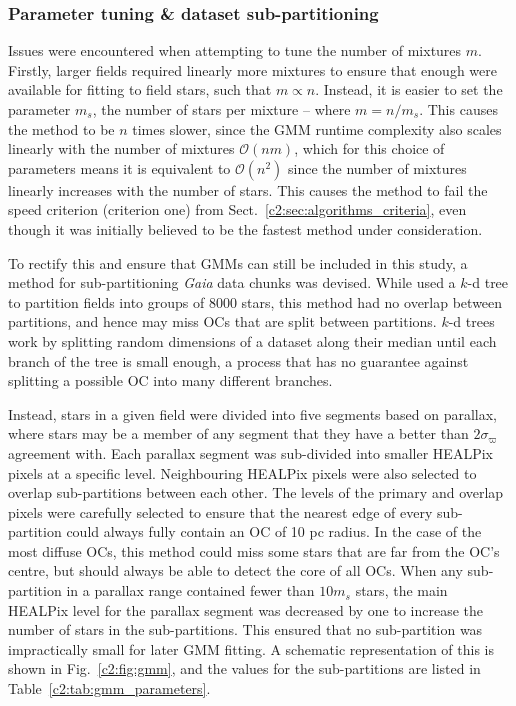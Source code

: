 \subsubsection{Parameter tuning \& dataset sub-partitioning}

Issues were encountered when attempting to tune the number of mixtures $m$. Firstly, larger fields required linearly more mixtures to ensure that enough were available for fitting to field stars, such that $m \propto n$. Instead, it is easier to set the parameter $m_s$, the number of stars per mixture -- where $m = n / m_s$. This causes the method to be $n$ times slower, since the GMM runtime complexity also scales linearly with the number of mixtures $\mathcal{O}(nm)$, which for this choice of parameters means it is equivalent to $\mathcal{O}(n^2)$ since the number of mixtures linearly increases with the number of stars. This causes the method to fail the speed criterion (criterion one) from Sect.~\ref{c2:sec:algorithms_criteria}, even though it was initially believed to be the fastest method under consideration.

To rectify this and ensure that GMMs can still be included in this study, a method for sub-partitioning \emph{Gaia} data chunks was devised. While \cite{cantat-gaudin_gaia_2019} used a $k$-d tree to partition fields into groups of 8000 stars, this method had no overlap between partitions, and hence may miss OCs that are split between partitions. $k$-d trees work by splitting random dimensions of a dataset along their median until each branch of the tree is small enough, a process that has no guarantee against splitting a possible OC into many different branches.

Instead, stars in a given field were divided into five segments based on parallax, where stars may be a member of any segment that they have a better than $2\sigma_{\varpi}$ agreement with. Each parallax segment was sub-divided into smaller HEALPix pixels at a specific level. Neighbouring HEALPix pixels were also selected to overlap sub-partitions between each other. The levels of the primary and overlap pixels were carefully selected to ensure that the nearest edge of every sub-partition could always fully contain an OC of 10 pc radius. In the case of the most diffuse OCs, this method could miss some stars that are far from the OC's centre, but should always be able to detect the core of all OCs. When any sub-partition in a parallax range contained fewer than $10m_s$ stars, the main HEALPix level for the parallax segment was decreased by one to increase the number of stars in the sub-partitions. This ensured that no sub-partition was impractically small for later GMM fitting. A schematic representation of this is shown in Fig.~\ref{c2:fig:gmm}, and the values for the sub-partitions are listed in Table~\ref{c2:tab:gmm_parameters}.

